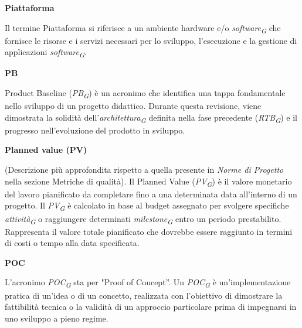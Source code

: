 \documentclass{article}
\begin{document}
\textbf{Piattaforma}

\vspace{0.1cm}

Il termine Piattaforma si riferisce a un ambiente hardware e/o \textit{software}\textsubscript{\textit{G}} che fornisce le risorse e i servizi necessari per lo sviluppo, l'esecuzione e la gestione di applicazioni \textit{software}\textsubscript{\textit{G}}.

\vspace{0.4cm}

\textbf{PB}

\vspace{0.1cm}

Product Baseline (\textit{PB}\textsubscript{\textit{G}}) è un acronimo che identifica una tappa fondamentale nello sviluppo di un progetto didattico. Durante questa revisione, viene dimostrata la solidità dell'\textit{architettura}\textsubscript{\textit{G}} definita nella fase precedente (\textit{RTB}\textsubscript{\textit{G}}) e il progresso nell'evoluzione del prodotto in sviluppo.

\vspace{0.4cm}

\textbf{Planned value (PV)}

\vspace{0.1cm}

(Descrizione più approfondita rispetto a quella presente in \textit{Norme di Progetto} nella sezione Metriche di qualità). 
Il Planned Value (\textit{PV}\textsubscript{\textit{G}}) è il valore monetario del lavoro pianificato da completare fino a una determinata data all'interno di un progetto. Il \textit{PV}\textsubscript{\textit{G}} è calcolato in base al budget assegnato per svolgere specifiche \textit{attività}\textsubscript{\textit{G}} o raggiungere determinati \textit{milestone}\textsubscript{\textit{G}} entro un periodo prestabilito. Rappresenta il valore totale pianificato che dovrebbe essere raggiunto in termini di costi o tempo alla data specificata.

\vspace{0.4cm}

\textbf{POC}

\vspace{0.1cm}

L'acronimo \textit{POC}\textsubscript{\textit{G}} sta per "Proof of Concept”. Un \textit{POC}\textsubscript{\textit{G}} è un'implementazione pratica di un'idea o di un concetto, realizzata con l'obiettivo di dimostrare la fattibilità tecnica o la validità di un approccio particolare prima di impegnarsi in uno sviluppo a pieno regime.
\end{document}
